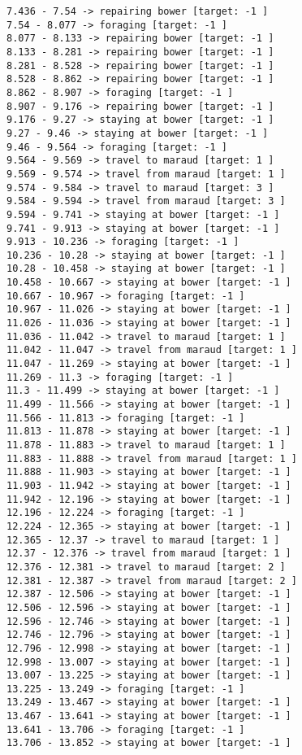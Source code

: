 \documentclass[11pt]{article}
\begin{document}
\begin{Verbatim}[commandchars=\\\{\}]
7.436 - 7.54 -> repairing bower [target: -1 ]
7.54 - 8.077 -> foraging [target: -1 ]
8.077 - 8.133 -> repairing bower [target: -1 ]
8.133 - 8.281 -> repairing bower [target: -1 ]
8.281 - 8.528 -> repairing bower [target: -1 ]
8.528 - 8.862 -> repairing bower [target: -1 ]
8.862 - 8.907 -> foraging [target: -1 ]
8.907 - 9.176 -> repairing bower [target: -1 ]
9.176 - 9.27 -> staying at bower [target: -1 ]
9.27 - 9.46 -> staying at bower [target: -1 ]
9.46 - 9.564 -> foraging [target: -1 ]
9.564 - 9.569 -> travel to maraud [target: 1 ]
9.569 - 9.574 -> travel from maraud [target: 1 ]
9.574 - 9.584 -> travel to maraud [target: 3 ]
9.584 - 9.594 -> travel from maraud [target: 3 ]
9.594 - 9.741 -> staying at bower [target: -1 ]
9.741 - 9.913 -> staying at bower [target: -1 ]
9.913 - 10.236 -> foraging [target: -1 ]
10.236 - 10.28 -> staying at bower [target: -1 ]
10.28 - 10.458 -> staying at bower [target: -1 ]
10.458 - 10.667 -> staying at bower [target: -1 ]
10.667 - 10.967 -> foraging [target: -1 ]
10.967 - 11.026 -> staying at bower [target: -1 ]
11.026 - 11.036 -> staying at bower [target: -1 ]
11.036 - 11.042 -> travel to maraud [target: 1 ]
11.042 - 11.047 -> travel from maraud [target: 1 ]
11.047 - 11.269 -> staying at bower [target: -1 ]
11.269 - 11.3 -> foraging [target: -1 ]
11.3 - 11.499 -> staying at bower [target: -1 ]
11.499 - 11.566 -> staying at bower [target: -1 ]
11.566 - 11.813 -> foraging [target: -1 ]
11.813 - 11.878 -> staying at bower [target: -1 ]
11.878 - 11.883 -> travel to maraud [target: 1 ]
11.883 - 11.888 -> travel from maraud [target: 1 ]
11.888 - 11.903 -> staying at bower [target: -1 ]
11.903 - 11.942 -> staying at bower [target: -1 ]
11.942 - 12.196 -> staying at bower [target: -1 ]
12.196 - 12.224 -> foraging [target: -1 ]
12.224 - 12.365 -> staying at bower [target: -1 ]
12.365 - 12.37 -> travel to maraud [target: 1 ]
12.37 - 12.376 -> travel from maraud [target: 1 ]
12.376 - 12.381 -> travel to maraud [target: 2 ]
12.381 - 12.387 -> travel from maraud [target: 2 ]
12.387 - 12.506 -> staying at bower [target: -1 ]
12.506 - 12.596 -> staying at bower [target: -1 ]
12.596 - 12.746 -> staying at bower [target: -1 ]
12.746 - 12.796 -> staying at bower [target: -1 ]
12.796 - 12.998 -> staying at bower [target: -1 ]
12.998 - 13.007 -> staying at bower [target: -1 ]
13.007 - 13.225 -> staying at bower [target: -1 ]
13.225 - 13.249 -> foraging [target: -1 ]
13.249 - 13.467 -> staying at bower [target: -1 ]
13.467 - 13.641 -> staying at bower [target: -1 ]
13.641 - 13.706 -> foraging [target: -1 ]
13.706 - 13.852 -> staying at bower [target: -1 ]

\end{Verbatim}
\end{document}
